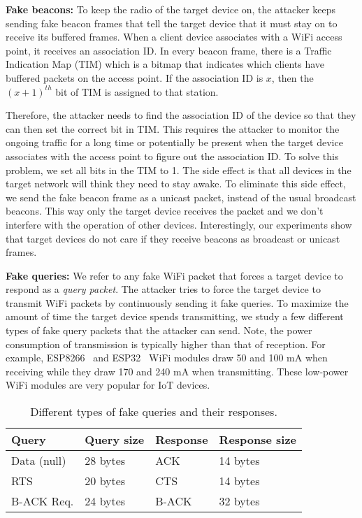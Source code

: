 \textbf{Fake beacons: } To keep the radio of the target device on, the attacker keeps sending fake beacon frames that tell the target device that it must stay on to receive its buffered frames.
When a client device associates with a WiFi access point, it receives an association ID. In every beacon frame, there is a Traffic Indication Map (TIM) which is a bitmap that indicates which clients have buffered packets on the access point. If the association ID is $x$, then the $(x+1)^{th}$ bit of TIM is assigned to that station.

Therefore, the attacker needs to find the association ID of the device so that they can then set the correct bit in TIM. This requires the attacker to monitor the ongoing traffic for a long time or potentially be present when the target device associates with the access point to figure out the association ID. 
To solve this problem, we set all bits in the TIM to 1. 
The side effect is that all devices in the target network will think they need to stay awake. To eliminate this side effect, we send the fake beacon frame as a unicast packet, instead of the usual broadcast beacons. This way only the target device receives the packet and we don't interfere with the operation of other devices. Interestingly, our experiments show that target devices do not care if they receive beacons as broadcast or unicast frames.

\textbf{Fake queries: }
We refer to any fake WiFi packet that forces a target device to respond as a \textit{query packet}. The attacker tries to force the target device to transmit WiFi packets by continuously sending it fake queries. To maximize the amount of time the target device spends transmitting, we study a few different types of fake query packets that the attacker can send. 
Note, the power consumption of transmission is typically higher than that of reception. For example, ESP8266~\cite{esp8266} and ESP32~\cite{esp32} WiFi modules draw 50 and 100 mA when receiving while they draw 170 and 240 mA when transmitting. 
These low-power WiFi modules are very popular for IoT devices.

\begin{table}[h]
    \centering
    \begin{tabular}{|l|l|l|l|}
        \hline
         Query & Query size & Response & Response size \\
         \hline
         Data (null)    &   28 bytes & ACK   &   14 bytes\\
         RTS            &  20 bytes & CTS   &  14 bytes\\
         B-ACK Req.     &  24 bytes & B-ACK &  32 bytes \\
         \hline
    \end{tabular}
    \caption{Different types of fake queries and their  responses.}
    \vspace{-10pt}
    \label{tbl:queries}
\end{table}



